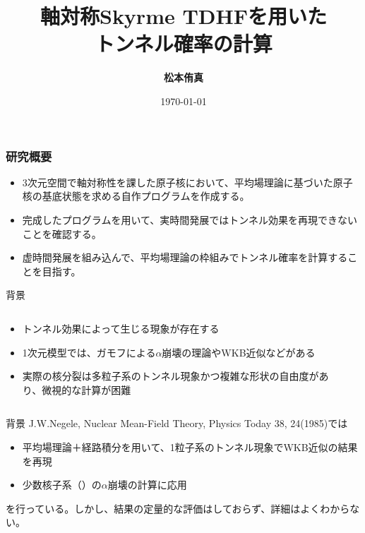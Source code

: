 \documentclass[11pt,aspectratio=169,xcolor=dvipsnames,table,dvipdfmx]{beamer}
\title{軸対称Skyrme TDHFを用いた\\トンネル確率の計算}
\author{\textbf{松本侑真}}
\date{\today}
\institute{原子核理論 関澤研究室}
\theoremstyle{definition}
\begin{document}
\maketitle

\begin{frame}
  \frametitle{研究概要}
  \begin{itemize}
    \item 3次元空間で軸対称性を課した原子核において、平均場理論に基づいた原子核の基底状態を求める自作プログラムを作成する。
    \item 完成したプログラムを用いて、実時間発展ではトンネル効果を再現できないことを確認する。
    \item 虚時間発展を組み込んで、平均場理論の枠組みでトンネル確率を計算することを目指す。
  \end{itemize}
\end{frame}


\begin{frame}{背景}
  \begin{columns}[t]
    \begin{column}{.5\textwidth}
      \begin{itemize}
        \item トンネル効果によって生じる現象が存在する
        \item 1次元模型では、ガモフによる$\alpha$崩壊の理論やWKB近似などがある
        \item 実際の核分裂は多粒子系のトンネル現象かつ複雑な形状の自由度があり、微視的な計算が困難
      \end{itemize}
  
    \end{column}
    \begin{column}{.5\textwidth}
    \end{column}
  \end{columns}
\end{frame}


\begin{frame}{背景}
  J.W.Negele, Nuclear Mean-Field Theory, Physics Today 38, 24(1985)では
  \begin{itemize}
    \item 平均場理論＋経路積分を用いて、1粒子系のトンネル現象でWKB近似の結果を再現
    \item 少数核子系（）の$\alpha$崩壊の計算に応用
  \end{itemize}
  を行っている。しかし、結果の定量的な評価はしておらず、詳細はよくわからない。
\end{frame}
\end{document}
